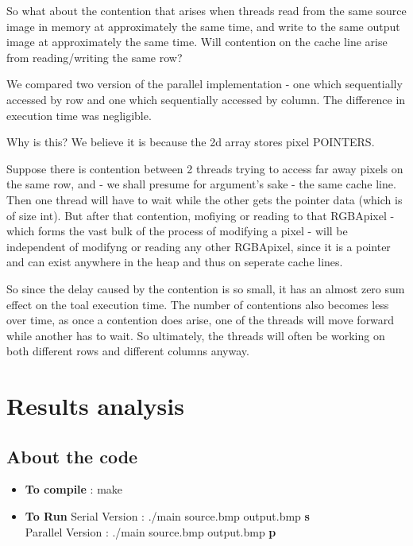 \documentclass[paper=a4, fontsize=11pt]{scrartcl} %
\numberwithin{equation}{section} %
\numberwithin{figure}{section} %
\numberwithin{table}{section} %
\begin{document}
So what about the contention that arises when threads read from the same source image in memory at approximately the same time, and write to the same output image at approximately the same time. Will contention on the cache line arise from reading/writing the same row?

We compared two version of the parallel implementation - one which sequentially accessed by row and one which sequentially accessed by column. The difference in execution time was negligible.

Why is this? We believe it is because the 2d array stores pixel POINTERS.

Suppose there is contention between 2 threads trying to access far away pixels on the same row, and - we shall presume for argument's sake - the same cache line. Then one thread will have to wait while the other gets the pointer data (which is of size int). But after that contention, mofiying or reading to that RGBApixel - which forms the vast bulk of the process of modifying a pixel - will be independent of modifyng or reading any other RGBApixel, since it is a pointer and can exist anywhere in the heap and thus on seperate cache lines.

So since the delay caused by the contention is so small, it has an almost zero sum effect on the toal execution time. The number of contentions also becomes less over time, as once a contention does arise, one of the threads will move forward while another has to wait. So ultimately, the threads will often be working on both different rows and different columns anyway.


\section{Results analysis}

\subsection{About the code}
\begin{itemize}

\item \textbf{To compile}  : make
\item \textbf{To Run}
	\subitem Serial Version : ./main source.bmp output.bmp \textbf{s} \\  
	\subitem Parallel Version : ./main source.bmp output.bmp \textbf{p} \\
	
\end{itemize}
\end{document}
